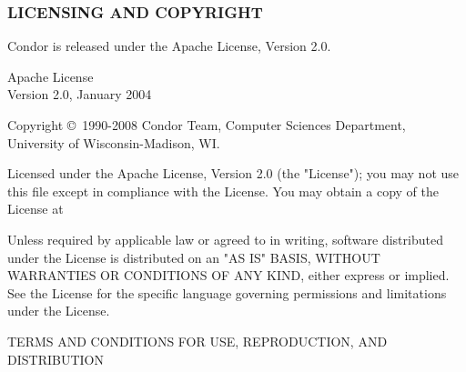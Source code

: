 \subsubsection*{\label{sec:license}LICENSING AND COPYRIGHT}

Condor is released under the Apache License, Version 2.0.

\begin{flushleft}
Apache License \\
Version 2.0, January 2004\\
\end{flushleft}

Copyright \copyright\ 1990-2008 Condor Team, Computer Sciences Department,
University of Wisconsin-Madison, WI. 

Licensed under the Apache License, Version 2.0 (the "License");
you may not use this file except in compliance with the License.
You may obtain a copy of the License at


Unless required by applicable law or agreed to in writing, software
distributed under the License is distributed on an "AS IS" BASIS,
WITHOUT WARRANTIES OR CONDITIONS OF ANY KIND, either express or implied.
See the License for the specific language governing permissions and
limitations under the License.


TERMS AND CONDITIONS FOR USE, REPRODUCTION, AND DISTRIBUTION

